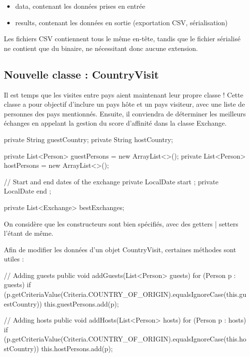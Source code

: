 \documentclass{mytex}
\begin{document}

\begin{itemize}
	\item data, contenant les données prises en entrée
	\item results, contenant les données en sortie (exportation CSV, sérialisation)
\end{itemize}

Les fichiers CSV contiennent tous le même en-tête, tandis que le fichier sérialisé ne contient que du binaire, ne nécessitant donc aucune extension.


\subsection{Nouvelle classe : CountryVisit}

Il est temps que les visites entre pays aient maintenant leur propre classe !
Cette classe a pour objectif d'inclure un pays hôte et un pays visiteur, avec une liste de personnes des pays mentionnés. Ensuite, il conviendra de déterminer les meilleurs échanges en appelant la gestion du score d'affinité dans la classe Exchange.


\begin{codebox}
private String guestCountry;
private String hostCountry;

private List<Person> guestPersons = new ArrayList<>();
private List<Person> hostPersons = new ArrayList<>();

// Start and end dates of the exchange
private LocalDate start ;
private LocalDate end ;

private List<Exchange> bestExchanges;
\end{codebox}

On considère que les constructeurs sont bien spécifiés, avec des getters | setters l'étant de même.


Afin de modifier les données d'un objet CountryVisit, certaines méthodes sont utiles :

\begin{codebox}
// Adding guests
public void addGuests(List<Person> guests) {
	for (Person p : guests) {
		if (p.getCriteriaValue(Criteria.COUNTRY_OF_ORIGIN).equalsIgnoreCase(this.guestCountry)) {
			this.guestPersons.add(p);
		}
	}
}

// Adding hosts
public void addHosts(List<Person> hosts) {
	for (Person p : hosts) {
		if (p.getCriteriaValue(Criteria.COUNTRY_OF_ORIGIN).equalsIgnoreCase(this.hostCountry)) {
			this.hostPersons.add(p);
		}
	}
}
\end{codebox}
\end{document}

